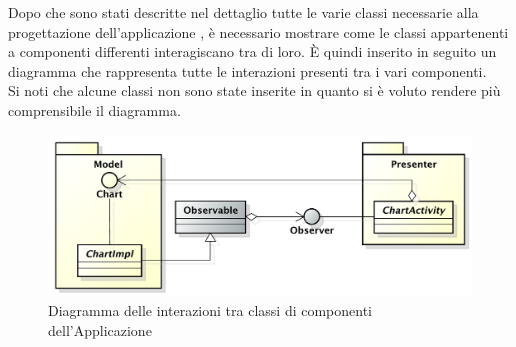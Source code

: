	Dopo che sono stati descritte nel dettaglio tutte le varie classi necessarie alla progettazione dell'applicazione , è necessario mostrare come le classi appartenenti a componenti differenti interagiscano tra di loro. È quindi inserito in seguito un diagramma  che rappresenta tutte le interazioni presenti tra i vari componenti.\\
	Si noti che alcune classi non sono state inserite in quanto si è voluto rendere più comprensibile il diagramma.

	\begin{figure}[H]\centering
		\includegraphics[width=\textwidth]{SpecificaTecnica/Pics/InterazioniComponentiApplicazione.pdf}
		\caption{Diagramma delle interazioni tra classi di componenti dell'Applicazione}
	\end{figure}